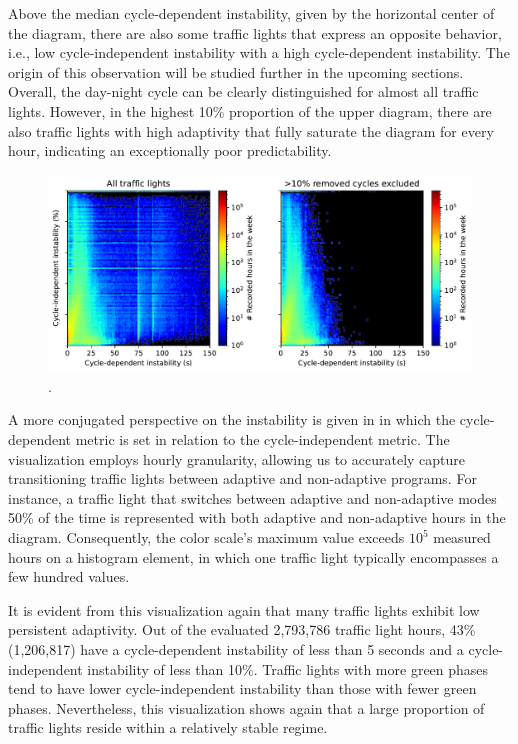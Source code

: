 Above the median cycle-dependent instability, given by the horizontal center of the diagram, there are also some traffic lights that express an opposite behavior, i.e., low cycle-independent instability with a high cycle-dependent instability. The origin of this observation will be studied further in the upcoming sections. Overall, the day-night cycle can be clearly distinguished for almost all traffic lights. However, in the highest 10\% proportion of the upper diagram, there are also traffic lights with high adaptivity that fully saturate the diagram for every hour, indicating an exceptionally poor predictability.

\begin{figure}[ht]
    \centering
    \includegraphics[width=\linewidth]{images/predictability-heatmap.pdf}
    \caption{.}\label{fig:predictability-heatmap}
\end{figure}

A more conjugated perspective on the instability is given in  in which the cycle-dependent metric is set in relation to the cycle-independent metric. The visualization employs hourly granularity, allowing us to accurately capture transitioning traffic lights between adaptive and non-adaptive programs. For instance, a traffic light that switches between adaptive and non-adaptive modes 50\% of the time is represented with both adaptive and non-adaptive hours in the diagram. Consequently, the color scale's maximum value exceeds $10^5$ measured hours on a histogram element, in which one traffic light typically encompasses a few hundred values.

It is evident from this visualization again that many traffic lights exhibit low persistent adaptivity. Out of the evaluated 2,793,786 traffic light hours, 43\% (1,206,817) have a cycle-dependent instability of less than 5 seconds and a cycle-independent instability of less than 10\%. Traffic lights with more green phases tend to have lower cycle-independent instability than those with fewer green phases. Nevertheless, this visualization shows again that a large proportion of traffic lights reside within a relatively stable regime.

